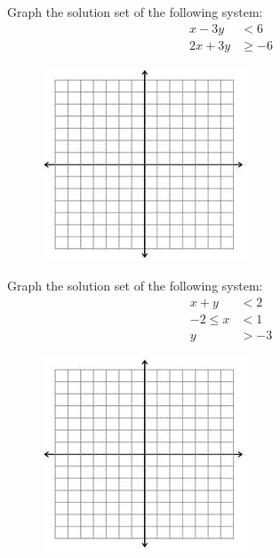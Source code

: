 \begin{example}
Graph the solution set of the following system:
\begin{align*}[left=\empheqlbrace]
x-3y&<6\\
 2x+3y&\ge -6
 \end{align*}
\begin{figure}[h]
\hfill\includegraphics[scale=1.25]{images/plane}
\end{figure}
\vspace{1in}
\end{example}

\newpage

\begin{example}
Graph the solution set of the following system:
\begin{align*}[left=\empheqlbrace]
x+y&<2\\
-2\le x &< 1\\
 y &> -3
 \end{align*}
\begin{figure}[h]
\hfill\includegraphics[scale=1.25]{images/plane}
\end{figure}
\vspace{1in}
\end{example}